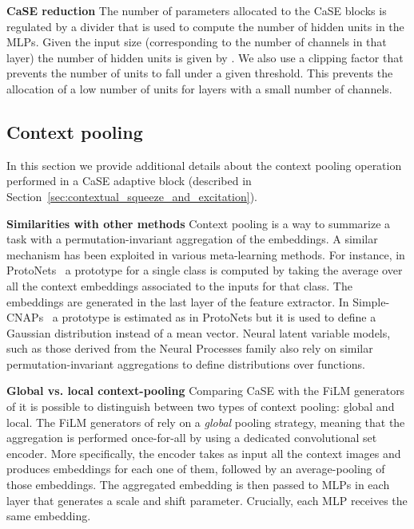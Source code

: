 \documentclass{article}
\begin{document}
\textbf{CaSE reduction} The number of parameters allocated to the CaSE blocks is regulated by a divider  that is used to compute the number of hidden units in the MLPs. Given the input size  (corresponding to the number of channels in that layer) the number of hidden units is given by .
We also use a clipping factor  that prevents the number of units to fall under a given threshold. This prevents the allocation of a low number of units for layers with a small number of channels.


\subsection{Context pooling}

In this section we provide additional details about the context pooling operation performed in a CaSE adaptive block (described in Section~\ref{sec:contextual_squeeze_and_excitation}). 

\textbf{Similarities with other methods} Context pooling is a way to summarize a task with a permutation-invariant aggregation of the embeddings. A similar mechanism has been exploited in various meta-learning methods. For instance, in ProtoNets~\citep{snell2017prototypical} a prototype for a single class is computed by taking the average over all the context embeddings associated to the inputs for that class. The embeddings are generated in the last layer of the feature extractor. In Simple-CNAPs~\citep{bateni2020improved} a prototype is estimated as in ProtoNets but it is used to define a Gaussian distribution instead of a mean vector. Neural latent variable models, such as those derived from the Neural Processes family \citep{garnelo2018neural} also rely on similar permutation-invariant aggregations to define
distributions over functions.

\textbf{Global vs. local context-pooling} Comparing CaSE with the FiLM generators of \cite{bronskill2021memory} it is possible to distinguish between two types of context pooling: global and local. The FiLM generators of \cite{bronskill2021memory} rely on a \emph{global} pooling strategy, meaning that the aggregation is performed once-for-all by using a dedicated convolutional set encoder. More specifically, the encoder takes as input all the context images and produces embeddings for each one of them, followed by an average-pooling of those embeddings. The aggregated embedding is then passed to MLPs in each layer that generates a scale and shift parameter. Crucially, each MLP receives the same embedding.
\end{document}
